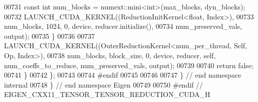 \begin{DoxyCode}
00731       \textcolor{keyword}{const} \textcolor{keywordtype}{int} num\_blocks = numext::mini<int>(max\_blocks, dyn\_blocks);
00732       LAUNCH\_CUDA\_KERNEL((ReductionInitKernel<float, Index>),
00733                          num\_blocks, 1024, 0, device, reducer.initialize(),
00734                          num\_preserved\_vals, output);
00735     \}
00736 
00737     LAUNCH\_CUDA\_KERNEL((OuterReductionKernel<num\_per\_thread, Self, Op, Index>),
00738                        num\_blocks, block\_size, 0, device, reducer, \textcolor{keyword}{self}, num\_coeffs\_to\_reduce, 
      num\_preserved\_vals, output);
00739 
00740     \textcolor{keywordflow}{return} \textcolor{keyword}{false};
00741   \}
00742 \};
00743 
00744 \textcolor{preprocessor}{#endif}
00745 
00746 
00747 \} \textcolor{comment}{// end namespace internal}
00748 \} \textcolor{comment}{// end namespace Eigen}
00749 
00750 \textcolor{preprocessor}{#endif // EIGEN\_CXX11\_TENSOR\_TENSOR\_REDUCTION\_CUDA\_H}
\end{DoxyCode}
